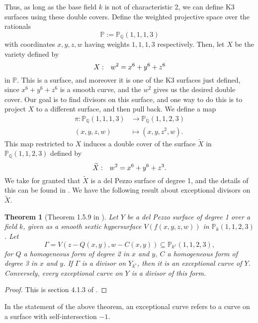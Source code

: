 \documentclass[12pt,twoside]{reedthesis}
\theoremstyle{plain}
\newtheorem{theorem}{Theorem}[chapter]
\theoremstyle{definition}
\theoremstyle{remark}
\newcommand{\QQ}{\mathbb{Q}}
\newcommand{\Proj}{\mathbb{P}}
\begin{document}
Thus, as long as the base field $k$ is not of characteristic 2, we can define K3 surfaces using these double covers. Define the weighted projective space over the rationals
\[
\Proj:=\Proj_\QQ(1,1,1,3)
\]
with coordinates $x,y,z,w$ having weights $1,1,1,3$ respectively. Then, let $X$ be the variety defined by 
\[
X:\hspace{0.25cm} w^2=x^6+y^6+z^6
\]
in $\Proj$. This is a surface, and moreover it is one of the K3 surfaces just defined, since $x^6+y^6+z^6$ is a smooth curve, and the $w^2$ gives us the desired double cover. Our goal is to find divisors on this surface, and one way to do this is to project $X$ to a different surface, and then pull back. We define a map
\begin{align*}
\pi:\Proj_\QQ(1,1,1,3)&\to\Proj_\QQ(1,1,2,3)\\
(x,y,z,w)&\mapsto(x,y,z^2,w).
\end{align*}
This map restricted to $X$ induces a double cover of the surface $\widetilde{X}$ in $\Proj_\QQ(1,1,2,3)$ defined by
\[
\widetilde{X}:\hspace{0.25cm} w^2=x^6+y^6+z^3.
\]
We take for granted that $\widetilde{X}$ is a del Pezzo surface of degree 1, and the details of this can be found in \cite{tonyThesis}. We have the following result about exceptional divisors on $\widetilde{X}$.
\begin{theorem}[Theorem 1.5.9 in \cite{tonyThesis}]
Let $Y$ be a del Pezzo surface of degree 1 over a field $k$, given as a smooth sextic hypersurface $V(f(x,y,z,w))$ in $\Proj_k(1,1,2,3)$. Let
\[
\Gamma=V(z-Q(x,y),w-C(x,y))\subseteq\Proj_{k^s}(1,1,2,3),
\]
for $Q$ a homogeneous form of degree 2 in $x$ and $y$, $C$ a homogeneous form of degree 3 in $x$ and $y$. If $\Gamma$ is a divisor on $Y_{k^s}$, then it is an exceptional curve of $Y$. Conversely, every exceptional curve on $Y$ is a divisor of this form.
\end{theorem}
\begin{proof}
This is section 4.1.3 of \cite{tonyThesis}.
\end{proof}
\noindent In the statement of the above theorem, an exceptional curve refers to a curve on a surface with self-intersection $-1$.
\end{document}
